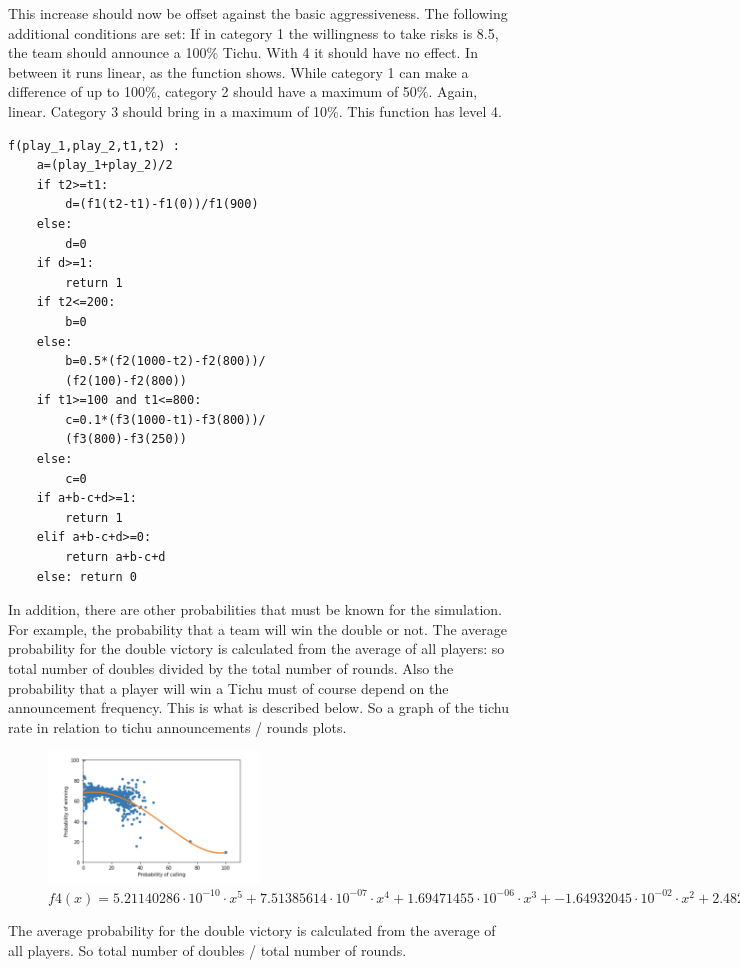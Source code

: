 This increase should now be offset against the basic aggressiveness.
The following additional conditions are set:
If in category 1 the willingness to take risks is 8.5, the team should announce a 100$\%$ Tichu. With 4 it should have no effect.  In between it runs linear, as the function shows.
While category 1 can make a difference of up to 100$\%$, category 2 should have a maximum of 50$\%$. Again, linear.
Category 3 should bring in a maximum of 10$\%$. This function has level 4.
\begin{lstlisting}
f(play_1,play_2,t1,t2) :
    a=(play_1+play_2)/2
    if t2>=t1:
        d=(f1(t2-t1)-f1(0))/f1(900)
    else: 
        d=0
    if d>=1:
        return 1
    if t2<=200:
        b=0
    else:
        b=0.5*(f2(1000-t2)-f2(800))/
        (f2(100)-f2(800))
    if t1>=100 and t1<=800:
        c=0.1*(f3(1000-t1)-f3(800))/
        (f3(800)-f3(250))
    else:
        c=0
    if a+b-c+d>=1:
        return 1
    elif a+b-c+d>=0:
        return a+b-c+d
    else: return 0
\end{lstlisting}


In addition, there are other probabilities that must be known for the simulation. For example, the probability that a team will win the double or not. The average probability for the double victory is calculated from the average of all players: so total number of doubles divided by the total number of rounds. Also the probability that a player will win a Tichu must of course depend on the announcement frequency. This is what is described below.
So a graph of the tichu rate in relation to tichu announcements / rounds plots.
\begin{figure}[h]
    \centering
    \includegraphics[width=0.5\textwidth]{Bilder/calling_winning_graph}
    \caption{$f4(x)=5.21140286\cdot 10^{-10}\cdot x^5+  7.51385614\cdot 10^{-07}\cdot x^4+  1.69471455\cdot 10^{-06}\cdot x^3+ -1.64932045\cdot 10^{-02}\cdot x^2+2.48230296\cdot 10^{-01}\cdot x + 67.7185027$}
    \label{fig:meine-grafik}
\end{figure}
The average probability for the double victory is calculated from the average of all players. So total number of doubles / total number of rounds.


